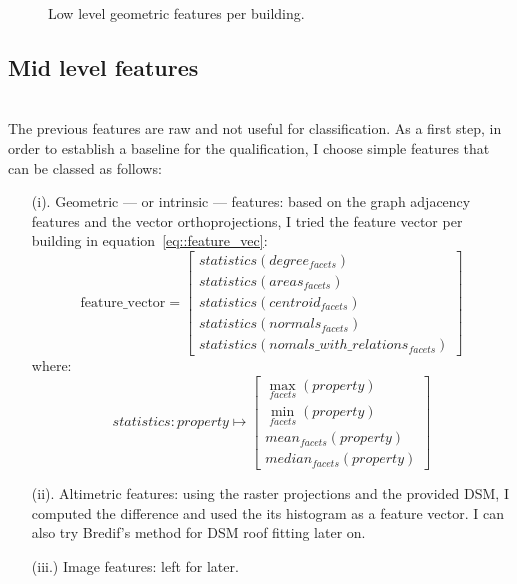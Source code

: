 \documentclass[a4paper, 11pt]{article}
\begin{document}
	\begin{figure}[H]
		
		\caption{\label{fig::geom_features} Low level geometric features per building.}
	\end{figure}
	\clearpage

	\subsection{Mid level features}
~\\

	The previous features are raw and not useful for classification. As a first
	step, in order to establish a baseline for the qualification, I choose simple
	features that can be classed as follows:
	\begin{itemize}
		\item[(i).] Geometric --- or intrinsic --- features: based on the graph adjacency features and the vector orthoprojections, I tried the feature vector per building in equation~\ref{eq::feature_vec}:
		\begin{equation}\label{eq::feature_vec}
			\text{feature\_vector} = \begin{bmatrix}
				statistics(degree_{facets})\\
				statistics(areas_{facets})\\
				statistics(centroid_{facets})\\
				statistics(normals_{facets})\\
				statistics(nomals\_with\_relations_{facets})
		\end{bmatrix}
		\end{equation}
		where:
		\begin{equation}
			statistics: property \mapsto \begin{bmatrix}
			\max_{facets}(property)\\
			\min_{facets}(property)\\
			mean_{facets}(property)\\
			median_{facets}(property)
		\end{bmatrix}
		\end{equation}
		\item[(ii).] Altimetric features: using the raster projections and the provided DSM, I computed the difference and used the its histogram as a feature vector. I can also try Bredif's method for DSM roof fitting later on.
		\item[(iii.)] Image features: left for later.
	\end{itemize}
\end{document}
